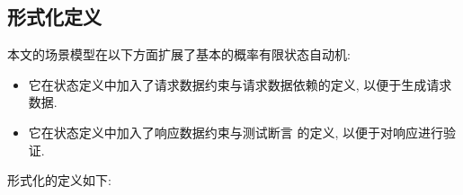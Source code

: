         \subsection{形式化定义}
            本文的场景模型在以下方面扩展了基本的概率有限状态自动机:
            
            \begin{itemize}
                \item 它在状态定义中加入了请求数据约束与请求数据依赖的定义, 以便于生成请求数据.
                
                \item 它在状态定义中加入了响应数据约束与测试断言 的定义, 以便于对响应进行验证.
            \end{itemize}
            
            形式化的定义如下:
            
